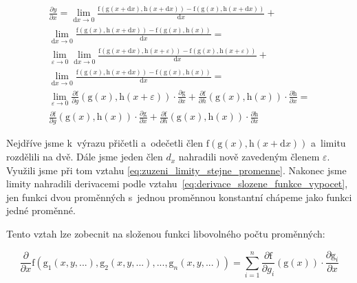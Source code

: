 \begin{equation}
\begin{split}
\frac{\partial y}{\partial x} = \lim_{\mathrm{d}x \to 0} \frac{\mathrm{f}(\mathrm{g}(x + \mathrm{d}x), \mathrm{h}(x + \mathrm{d}x)) - \mathrm{f}(\mathrm{g}(x), \mathrm{h}(x + \mathrm{d}x))}{\mathrm{d}x} + \\
\lim_{\mathrm{d}x \to 0} \frac{\mathrm{f}(\mathrm{g}(x), \mathrm{h}(x + \mathrm{d}x)) - \mathrm{f}(\mathrm{g}(x), \mathrm{h}(x))}{\mathrm{d}x} = \\
\lim_{\varepsilon \to 0} \lim_{\mathrm{d}x \to 0} \frac{\mathrm{f}(\mathrm{g}(x + \mathrm{d}x), \mathrm{h}(x + \varepsilon)) - \mathrm{f}(\mathrm{g}(x), \mathrm{h}(x + \varepsilon))}{\mathrm{d}x} + \\
\lim_{\mathrm{d}x \to 0} \frac{\mathrm{f}(\mathrm{g}(x), \mathrm{h}(x + \mathrm{d}x)) - \mathrm{f}(\mathrm{g}(x), \mathrm{h}(x))}{\mathrm{d}x} = \\
\lim_{\varepsilon \to 0} \frac{\partial \mathrm{f}}{\partial g}(\mathrm{g}(x), \mathrm{h}(x + \varepsilon)) \cdot \frac{\partial \mathrm{g}}{\partial x} +
\frac{\partial \mathrm{f}}{\partial h}(\mathrm{g}(x), \mathrm{h}(x)) \cdot \frac{\partial \mathrm{h}}{\partial x} = \\
\frac{\partial \mathrm{f}}{\partial g}(\mathrm{g}(x), \mathrm{h}(x)) \cdot \frac{\partial \mathrm{g}}{\partial x} +
\frac{\partial \mathrm{f}}{\partial h}(\mathrm{g}(x), \mathrm{h}(x)) \cdot \frac{\partial \mathrm{h}}{\partial x}
\end{split}
\end{equation}

Nejdříve jsme k~výrazu přičetli a~odečetli člen \(\mathrm{f}(\mathrm{g}(x), \mathrm{h}(x + \mathrm{d}x))\) a~limitu rozdělili na dvě. Dále jsme jeden člen \(d_x\) nahradili nově zavedeným členem \(\varepsilon\). Využili jsme při tom vztahu \eqref{eq:zuzeni_limity_stejne_promenne}.
Nakonec jsme limity nahradili derivacemi podle vztahu~\eqref{eq:derivace_slozene_funkce_vypocet}, jen funkci dvou proměnných s~jednou proměnnou konstantní chápeme jako funkci jedné proměnné.

Tento vztah lze zobecnit na složenou funkci libovolného počtu proměnných:

\begin{equation}
\frac{\partial}{\partial x} \mathrm{f} (\mathrm{g}_1(x, y, ...), \mathrm{g}_2(x, y, ...), ..., \mathrm{g}_n(x, y, ...)) = \sum_{i=1}^n \frac{\partial \mathrm{f}}{\partial g_i}(\mathrm{g}(x)) \cdot \frac{\partial \mathrm{g}_i}{\partial x}
\end{equation}

